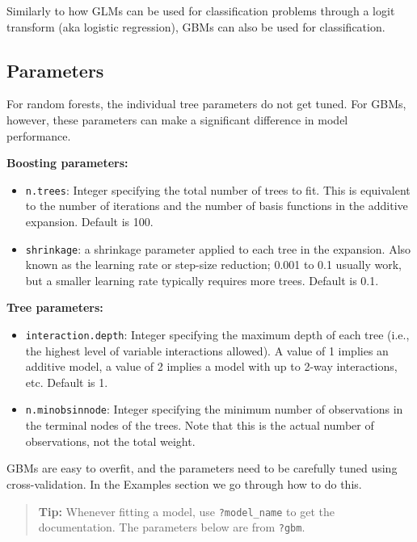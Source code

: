 \documentclass[
  openany]{book}
\begin{document}
Similarly to how GLMs can be used for classification problems through a logit transform (aka logistic regression), GBMs can also be used for classification.

\hypertarget{parameters}{%
\subsection{Parameters}\label{parameters}}

For random forests, the individual tree parameters do not get tuned. For GBMs, however, these parameters can make a significant difference in model performance.

\textbf{Boosting parameters:}

\begin{itemize}
\item
  \texttt{n.trees}: Integer specifying the total number of trees to fit. This is equivalent to the number of iterations and the number of basis functions in the additive expansion. Default is 100.
\item
  \texttt{shrinkage}: a shrinkage parameter applied to each tree in the expansion. Also known as the learning rate or step-size reduction; 0.001 to 0.1 usually work, but a smaller learning rate typically requires more trees. Default is 0.1.
\end{itemize}

\textbf{Tree parameters:}

\begin{itemize}
\item
  \texttt{interaction.depth}: Integer specifying the maximum depth of each tree (i.e., the highest level of variable interactions allowed). A value of 1 implies an additive model, a value of 2 implies a model with up to 2-way interactions, etc. Default is 1.
\item
  \texttt{n.minobsinnode}: Integer specifying the minimum number of observations in the terminal nodes of the trees. Note that this is the actual number of observations, not the total weight.
\end{itemize}

GBMs are easy to overfit, and the parameters need to be carefully tuned using cross-validation. In the Examples section we go through how to do this.

\begin{quote}
\textbf{Tip:} Whenever fitting a model, use \texttt{?model\_name} to get the documentation. The parameters below are from \texttt{?gbm}.
\end{quote}
\end{document}

